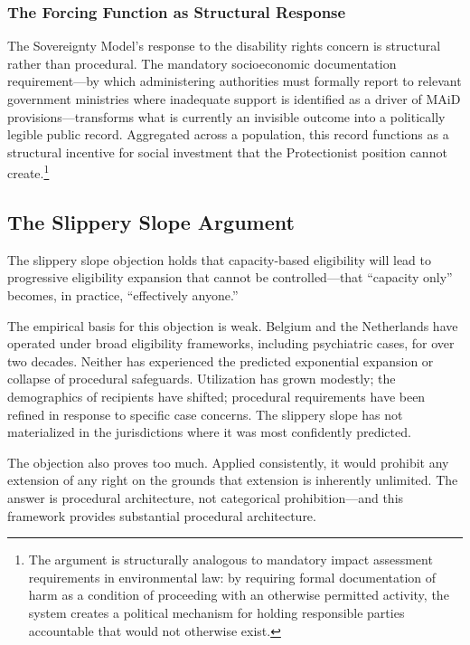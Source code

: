 \documentclass[11pt, letterpaper]{article}
\begin{document}
\subsubsection{The Forcing Function as Structural Response}

The Sovereignty Model's response to the disability rights concern is structural rather
than procedural. The mandatory socioeconomic documentation requirement---by which
administering authorities must formally report to relevant government ministries where
inadequate support is identified as a driver of MAiD provisions---transforms what is
currently an invisible outcome into a politically legible public record. Aggregated
across a population, this record functions as a structural incentive for social
investment that the Protectionist position cannot create.\footnote{%
  The argument is structurally analogous to mandatory impact assessment requirements
  in environmental law: by requiring formal documentation of harm as a condition of
  proceeding with an otherwise permitted activity, the system creates a political
  mechanism for holding responsible parties accountable that would not otherwise exist.}

\subsection{The Slippery Slope Argument}

The slippery slope objection holds that capacity-based eligibility will lead to
progressive eligibility expansion that cannot be controlled---that ``capacity only''
becomes, in practice, ``effectively anyone.''

The empirical basis for this objection is weak. Belgium and the Netherlands have
operated under broad eligibility frameworks, including psychiatric cases, for over
two decades. Neither has experienced the predicted exponential expansion or collapse
of procedural safeguards. Utilization has grown modestly; the demographics of
recipients have shifted; procedural requirements have been refined in response to
specific case concerns. The slippery slope has not materialized in the jurisdictions
where it was most confidently predicted.

The objection also proves too much. Applied consistently, it would prohibit any
extension of any right on the grounds that extension is inherently unlimited. The
answer is procedural architecture, not categorical prohibition---and this framework
provides substantial procedural architecture.
\end{document}
